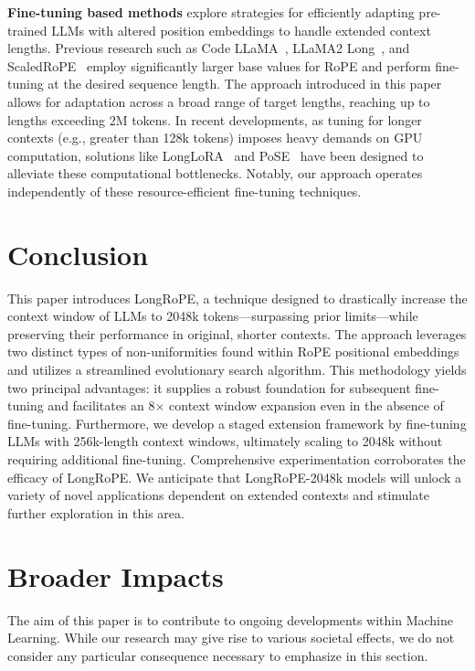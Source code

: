 \textbf{Fine-tuning based methods} explore strategies for efficiently adapting pre-trained LLMs with altered position embeddings to handle extended context lengths. Previous research such as Code LLaMA~\cite{codellama}, LLaMA2 Long~\cite{xiong2023effective}, and ScaledRoPE~\cite{liu2023scaling} employ significantly larger base values for RoPE and perform fine-tuning at the desired sequence length. The approach introduced in this paper allows for adaptation across a broad range of target lengths, reaching up to lengths exceeding 2M tokens. In recent developments, as tuning for longer contexts (e.g., greater than 128k tokens) imposes heavy demands on GPU computation, solutions like LongLoRA~\cite{longlora} and PoSE~\cite{zhu2023pose} have been designed to alleviate these computational bottlenecks. Notably, our approach operates independently of these resource-efficient fine-tuning techniques.

\section{Conclusion}

This paper introduces LongRoPE, a technique designed to drastically increase the context window of LLMs to 2048k tokens—surpassing prior limits—while preserving their performance in original, shorter contexts. The approach leverages two distinct types of non-uniformities found within RoPE positional embeddings and utilizes a streamlined evolutionary search algorithm. This methodology yields two principal advantages: it supplies a robust foundation for subsequent fine-tuning and facilitates an 8$\times$ context window expansion even in the absence of fine-tuning. Furthermore, we develop a staged extension framework by fine-tuning LLMs with 256k-length context windows, ultimately scaling to 2048k without requiring additional fine-tuning. Comprehensive experimentation corroborates the efficacy of LongRoPE. We anticipate that LongRoPE-2048k models will unlock a variety of novel applications dependent on extended contexts and stimulate further exploration in this area.

\section*{Broader Impacts} The aim of this paper is to contribute to ongoing developments within Machine Learning. While our research may give rise to various societal effects, we do not consider any particular consequence necessary to emphasize in this section.

	\balance

